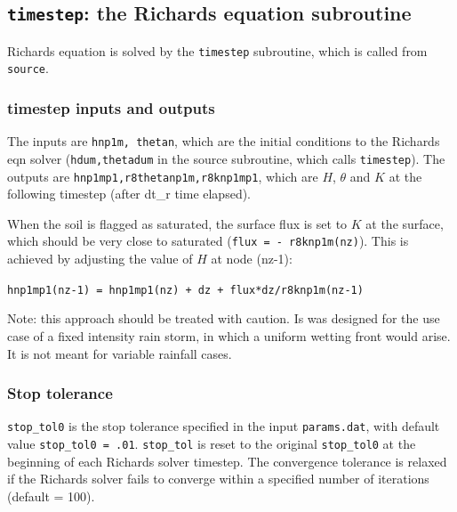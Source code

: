 \documentclass{article}
\newcommand{\code}[1]{\texttt{#1}}
\begin{document}
	
 

\subsection{\code{timestep}: the Richards equation subroutine }

Richards equation is solved by the \code{timestep} subroutine, which is called from \code{source}.
	
\subsubsection*{timestep inputs and outputs }
The inputs are \code{hnp1m, thetan}, which are the initial conditions to the Richards eqn solver (\code{hdum,thetadum} in the source subroutine, which calls \code{timestep}).  
The outputs are  \code{hnp1mp1,r8thetanp1m,r8knp1mp1}, which are  $H$, $\theta$ and $K$ at the following timestep (after dt\_r  time elapsed).



When the soil is flagged as saturated,  the surface flux is set to $K$ at the surface, which should be very close to saturated (\code{flux  = - r8knp1m(nz)}).  This is achieved by adjusting the value of $H$ at node (nz-1):
\begin{center}
\code{hnp1mp1(nz-1) = hnp1mp1(nz) + dz + flux*dz/r8knp1m(nz-1)}	
\end{center}

Note: this approach should be treated with caution.  Is was designed for the use case of a fixed intensity rain storm, in which a uniform wetting front would arise.  It is not meant for variable rainfall cases.

\subsubsection*{Stop tolerance }
\code{stop\_tol0} is the stop tolerance specified in the input \code{params.dat}, with default value \code{stop\_tol0 = .01}.  
\code{stop\_tol} is reset to the original \code{stop\_tol0}  at the beginning of each Richards solver timestep.  The convergence tolerance  is relaxed if the Richards solver fails to converge within a specified number of iterations (default = 100).
\end{document}
